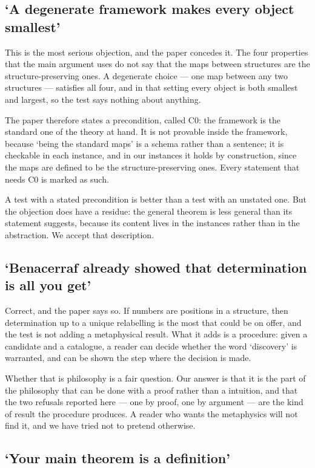 \documentclass[12pt,a4paper]{article}
\begin{document}
\subsection{`A degenerate framework makes every object smallest'}

This is the most serious objection, and the paper concedes it.  The four
properties that the main argument uses do not say that the maps between
structures are the structure-preserving ones.  A degenerate choice --- one map
between any two structures --- satisfies all four, and in that setting every
object is both smallest and largest, so the test says nothing about anything.

The paper therefore states a precondition, called C0: the framework is the
standard one of the theory at hand.  It is not provable inside the framework,
because `being the standard maps' is a schema rather than a sentence; it is
checkable in each instance, and in our instances it holds by construction, since
the maps are defined to be the structure-preserving ones.  Every statement that
needs C0 is marked as such.

A test with a stated precondition is better than a test with an unstated one.  But
the objection does have a residue: the general theorem is less general than its
statement suggests, because its content lives in the instances rather than in the
abstraction.  We accept that description.

\subsection{`Benacerraf already showed that determination is all you get'}

Correct, and the paper says so.  If numbers are positions in a structure, then
determination up to a unique relabelling is the most that could be on offer, and
the test is not adding a metaphysical result.  What it adds is a procedure: given
a candidate and a catalogue, a reader can decide whether the word `discovery' is
warranted, and can be shown the step where the decision is made.

Whether that is philosophy is a fair question.  Our answer is that it is the part
of the philosophy that can be done with a proof rather than a intuition, and that
the two refusals reported here --- one by proof, one by argument --- are the kind
of result the procedure produces.  A reader who wants the metaphysics will not find
it, and we have tried not to pretend otherwise.

\subsection{`Your main theorem is a definition'}
\end{document}
